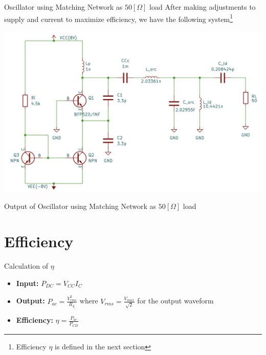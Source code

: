 \documentclass{beamer}
\begin{document}
\begin{frame}{Oscillator using Matching Network as \(50[\Omega]\) load}
  After making adjustments to supply and current to maximize efficiency, we have the following system\footnote{Efficiency \(\eta\) is defined in the next section}
  \begin{center}
    \includegraphics[width=0.85\linewidth]{images/Full_system.png}
  \end{center}
\end{frame}


\begin{frame}{Output of Oscillator using Matching Network as \(50[\Omega]\) load}


\end{frame}


\section{Efficiency}

\begin{frame}{Calculation of \(\eta\)}
\begin{itemize}
  \item <1-> \textbf{Input:} \(P_{DC} = V_{CC}I_C\)
  \item <2-> \textbf{Output:} \(P_{ac} = \frac{V_{rms}^2}{R_L}\) where \(V_{rms}=\frac{V_{max}}{\sqrt{2}}\) for the output waveform
  \item <3-> \textbf{Efficiency:} \(\eta=\frac{P_{ac}}{P_{CD}}\)
\end{itemize}

\end{frame}
\end{document}
